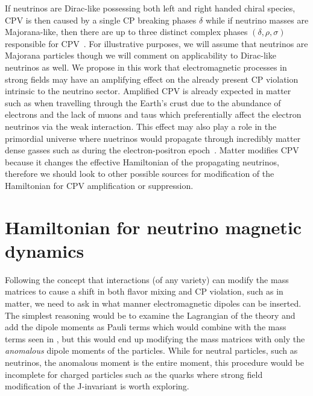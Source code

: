 If neutrinos are Dirac-like possessing both left and right handed chiral species, CPV is then caused by a single CP breaking phases $\delta$ while if neutrino masses are Majorana-like, then there are up to three distinct complex phases $(\delta,\rho,\sigma)$ responsible for CPV~\citep{giunti2007fundamentals}. For illustrative purposes, we will assume that neutrinos are Majorana particles though we will comment on applicability to Dirac-like neutrinos as well. We propose in this work that electromagnetic processes in strong fields may have an amplifying effect on the already present CP violation intrinsic to the neutrino sector. Amplified CPV is already expected in matter~\citep{harrison2000cp} such as when travelling through the Earth's crust due to the abundance of electrons and the lack of muons and taus which preferentially affect the electron neutrinos via the weak interaction. This effect may also play a role in the primordial universe where nuetrinos would propagate through incredibly matter dense gasses such as during the electron-positron epoch~\citep{rafelski2023short}. Matter modifies CPV because it changes the effective Hamiltonian of the propagating neutrinos, therefore we should look to other possible sources for modification of the Hamiltonian for CPV amplification or suppression.

\section{Hamiltonian for neutrino magnetic dynamics}\label{sec:effective}
\noindent Following the concept that interactions (of any variety) can modify the mass matrices to cause a shift in both flavor mixing and CP violation, such as in matter, we need to ask in what manner electromagnetic dipoles can be inserted. The simplest reasoning would be to examine the Lagrangian of the theory and add the dipole moments as Pauli terms \ar which would combine with the mass terms seen in , but this would end up modifying the mass matrices with only the \emph{anomalous} dipole moments of the particles. While for neutral particles, such as neutrinos, the anomalous moment is the entire moment, this procedure would be incomplete for charged particles such as the quarks where strong field modification of the J-invariant is worth exploring.


